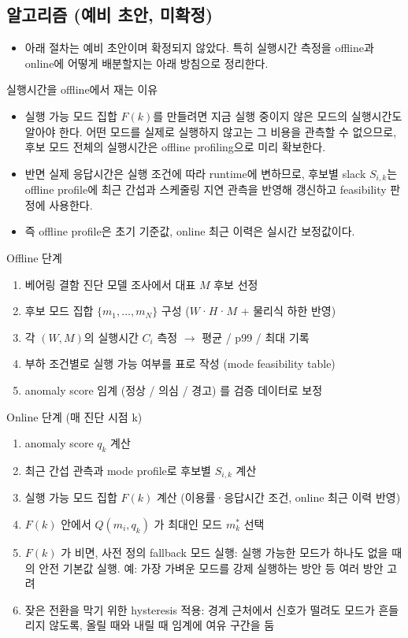 \documentclass[10pt]{article}
\begin{document}
\subsection{알고리즘 (예비 초안, 미확정)}
\begin{itemize}
\item 아래 절차는 예비 초안이며 확정되지 않았다. 특히 실행시간 측정을 offline과 online에 어떻게 배분할지는 아래 방침으로 정리한다.
\end{itemize}
\noindent 실행시간을 offline에서 재는 이유
\begin{itemize}
\item 실행 가능 모드 집합 $F(k)$를 만들려면 지금 실행 중이지 않은 모드의 실행시간도 알아야 한다. 어떤 모드를 실제로 실행하지 않고는 그 비용을 관측할 수 없으므로, 후보 모드 전체의 실행시간은 offline profiling으로 미리 확보한다.
\item 반면 실제 응답시간은 실행 조건에 따라 runtime에 변하므로, 후보별 slack $S_{i,k}$는 offline profile에 최근 간섭과 스케줄링 지연 관측을 반영해 갱신하고 feasibility 판정에 사용한다.
\item 즉 offline profile은 초기 기준값, online 최근 이력은 실시간 보정값이다.
\end{itemize}
\noindent Offline 단계
\begin{enumerate}
\item 베어링 결함 진단 모델 조사에서 대표 $M$ 후보 선정
\item 후보 모드 집합 $\{m_1, \dots, m_N\}$ 구성 ($W$·$H$·$M$ + 물리식 하한 반영)
\item 각 $(W,M)$의 실행시간 $C_i$ 측정 $\rightarrow$ 평균 / p99 / 최대 기록
\item 부하 조건별로 실행 가능 여부를 표로 작성 (mode feasibility table)
\item anomaly score 임계 (정상 / 의심 / 경고) 를 검증 데이터로 보정
\end{enumerate}
\noindent Online 단계 (매 진단 시점 k)
\begin{enumerate}
\item anomaly score $q_k$ 계산
\item 최근 간섭 관측과 mode profile로 후보별 $S_{i,k}$ 계산
\item 실행 가능 모드 집합 $F(k)$ 계산 (이용률·응답시간 조건, online 최근 이력 반영)
\item $F(k)$ 안에서 $Q(m_i, q_k)$ 가 최대인 모드 $m^{*}_k$ 선택
\item $F(k)$ 가 비면, 사전 정의 fallback 모드 실행: 실행 가능한 모드가 하나도 없을 때의 안전 기본값 실행. 예: 가장 가벼운 모드를 강제 실행하는 방안 등 여러 방안 고려
\item 잦은 전환을 막기 위한 hysteresis 적용: 경계 근처에서 신호가 떨려도 모드가 흔들리지 않도록, 올릴 때와 내릴 때 임계에 여유 구간을 둠
\end{enumerate}
\end{document}
